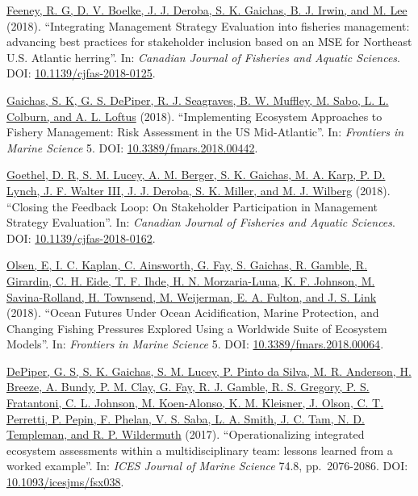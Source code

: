 \documentclass[11pt, a4paper]{awesome-cv}
\begin{document}
\protect\hyperlink{cite-feeney_integrating_2018}{Feeney, R. G, D. V. Boelke, J.
J. Deroba, S. K. Gaichas, B. J. Irwin, and M.
Lee} (2018). ``Integrating Management
Strategy Evaluation into fisheries management: advancing best practices
for stakeholder inclusion based on an MSE for Northeast U.S. Atlantic
herring''. In: \emph{Canadian Journal of Fisheries and Aquatic Sciences}.
DOI:
\href{https://doi.org/10.1139\%2Fcjfas-2018-0125}{10.1139/cjfas-2018-0125}.

\protect\hyperlink{cite-gaichas_implementing_2018}{Gaichas, S. K, G. S.
DePiper, R. J. Seagraves, B. W. Muffley, M. Sabo, L. L. Colburn, and A.
L. Loftus} (2018). ``Implementing
Ecosystem Approaches to Fishery Management: Risk Assessment in the US
Mid-Atlantic''. In: \emph{Frontiers in Marine Science} 5. DOI:
\href{https://doi.org/10.3389\%2Ffmars.2018.00442}{10.3389/fmars.2018.00442}.

\protect\hyperlink{cite-goethel_closing_2018}{Goethel, D. R, S. M. Lucey, A. M.
Berger, S. K. Gaichas, M. A. Karp, P. D. Lynch, J. F. Walter III, J. J.
Deroba, S. K. Miller, and M. J. Wilberg}
(2018). ``Closing the Feedback Loop: On Stakeholder Participation in
Management Strategy Evaluation''. In: \emph{Canadian Journal of Fisheries and
Aquatic Sciences}. DOI:
\href{https://doi.org/10.1139\%2Fcjfas-2018-0162}{10.1139/cjfas-2018-0162}.

\protect\hyperlink{cite-olsen_ocean_2018}{Olsen, E, I. C. Kaplan, C. Ainsworth,
G. Fay, S. Gaichas, R. Gamble, R. Girardin, C. H. Eide, T. F. Ihde, H.
N. Morzaria-Luna, K. F. Johnson, M. Savina-Rolland, H. Townsend, M.
Weijerman, E. A. Fulton, and J. S. Link}
(2018). ``Ocean Futures Under Ocean Acidification, Marine Protection,
and Changing Fishing Pressures Explored Using a Worldwide Suite of
Ecosystem Models''. In: \emph{Frontiers in Marine Science} 5. DOI:
\href{https://doi.org/10.3389\%2Ffmars.2018.00064}{10.3389/fmars.2018.00064}.

\protect\hyperlink{cite-depiper_operationalizing_2017}{DePiper, G. S, S. K.
Gaichas, S. M. Lucey, P. Pinto da Silva, M. R. Anderson, H. Breeze, A.
Bundy, P. M. Clay, G. Fay, R. J. Gamble, R. S. Gregory, P. S.
Fratantoni, C. L. Johnson, M. Koen-Alonso, K. M. Kleisner, J. Olson, C.
T. Perretti, P. Pepin, F. Phelan, V. S. Saba, L. A. Smith, J. C. Tam,
N. D. Templeman, and R. P.
Wildermuth} (2017).
``Operationalizing integrated ecosystem assessments within a
multidisciplinary team: lessons learned from a worked example''. In:
\emph{ICES Journal of Marine Science} 74.8, pp.~2076-2086. DOI:
\href{https://doi.org/10.1093\%2Ficesjms\%2Ffsx038}{10.1093/icesjms/fsx038}.
\end{document}
